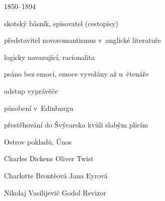 {\parag{\getauthor}
\begin{compactitem}
	\item 1850--1894
	\item skotský básník, spisovatel (cestopisy)
	\item představitel novoromantismus v~anglické literatuře
		\begin{compactitem}
			\item logicky navazující, racionalita
			\item psáno bez emocí, emoce vyvolány až u~čtenáře
			\item odstup vyprávěče
		\end{compactitem}
	\item působení v~Edinburgu
	\item přestěhování do Švýcarska kvůli slabým plicím
	\item Ostrov pokladů, Únos
\end{compactitem}

\begin{compactdesc}
		\item[Charles Dickens] Oliver Twist
		\item[Charlotte Brontëová] Jana Eyrová
		\item[Nikolaj Vasilijevič Godol] Revizor
\end{compactdesc}
}
